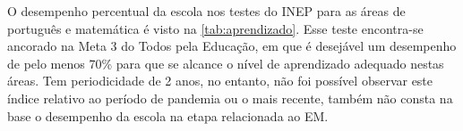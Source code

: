 \setlength\intextsep{0pt}
\begin{table}
	\centering
	\caption{Taxa de desempenho}
	\label{tab:aprendizado}
\end{table}
O desempenho percentual da escola nos testes do \ac{INEP} para as áreas de português e matemática é visto na \autoref{tab:aprendizado}. Esse teste encontra-se ancorado na Meta 3 do Todos pela Educação, em que é desejável um desempenho de pelo menos 70\% para que se alcance o nível de aprendizado adequado nestas áreas. Tem periodicidade de 2 anos, no entanto, não foi possível observar este índice relativo ao período de pandemia ou o mais recente, também não consta na base o desempenho da escola na etapa relacionada ao \ac{EM}.


